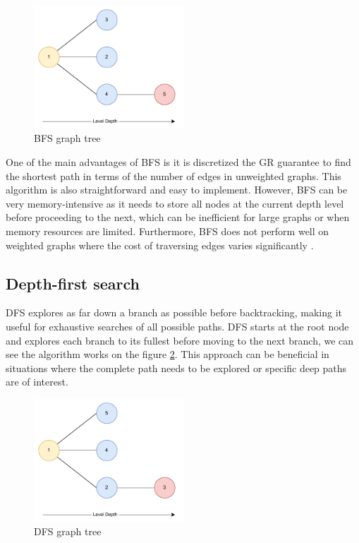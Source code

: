 \documentclass[12pt]{report}
\begin{document}
        \begin{figure}[H]
            \centering
            \includegraphics[width=0.5\textwidth]{General Image/OSM Drone-BFS.pdf}
            \caption{BFS graph tree}
            \label{fig:bfs}
        \end{figure}

        One of the main advantages of BFS is it is discretized the GR guarantee to find the shortest path in terms of the number of edges
        in unweighted graphs. This algorithm is also straightforward and easy to implement. However, BFS can be very
        memory-intensive as it needs to store all nodes at the current depth level before proceeding to the next, which
        can be inefficient for large graphs or when memory resources are limited. Furthermore, BFS does not perform well
        on weighted graphs where the cost of traversing edges varies significantly \cite{cormen_introduction_2022}.

        \subsection{Depth-first search} 
        \ac{DFS} explores as far down a branch as possible before backtracking, making it useful for exhaustive searches
        of all possible paths. DFS starts at the root node and explores each branch to its fullest before moving to the
        next branch, we can see the algorithm works on the figure \ref{fig:dfs}. This approach can be beneficial in
        situations where the complete path needs to be explored or specific deep paths are of interest.

        \begin{figure}[H]
            \centering
            \includegraphics[width=0.5\textwidth]{General Image/OSM Drone-DFS.pdf}
            \caption{DFS graph tree}
            \label{fig:dfs}
        \end{figure}
\end{document}
